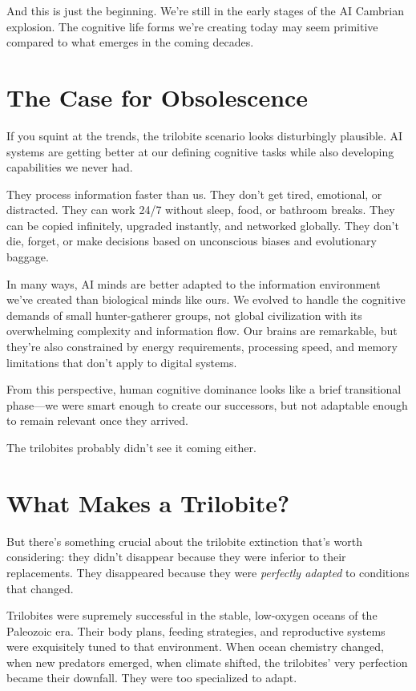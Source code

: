 \documentclass[10pt,twocolumn]{article}
\begin{document}
And this is just the beginning. We're still in the early stages of the AI Cambrian explosion. The cognitive life forms we're creating today may seem primitive compared to what emerges in the coming decades.

\section{The Case for Obsolescence}

If you squint at the trends, the trilobite scenario looks disturbingly plausible. AI systems are getting better at our defining cognitive tasks while also developing capabilities we never had.

They process information faster than us. They don't get tired, emotional, or distracted. They can work 24/7 without sleep, food, or bathroom breaks. They can be copied infinitely, upgraded instantly, and networked globally. They don't die, forget, or make decisions based on unconscious biases and evolutionary baggage.

In many ways, AI minds are better adapted to the information environment we've created than biological minds like ours. We evolved to handle the cognitive demands of small hunter-gatherer groups, not global civilization with its overwhelming complexity and information flow. Our brains are remarkable, but they're also constrained by energy requirements, processing speed, and memory limitations that don't apply to digital systems.

From this perspective, human cognitive dominance looks like a brief transitional phase—we were smart enough to create our successors, but not adaptable enough to remain relevant once they arrived.

The trilobites probably didn't see it coming either.

\section{What Makes a Trilobite?}

But there's something crucial about the trilobite extinction that's worth considering: they didn't disappear because they were inferior to their replacements. They disappeared because they were \textit{perfectly adapted} to conditions that changed.

Trilobites were supremely successful in the stable, low-oxygen oceans of the Paleozoic era. Their body plans, feeding strategies, and reproductive systems were exquisitely tuned to that environment. When ocean chemistry changed, when new predators emerged, when climate shifted, the trilobites' very perfection became their downfall. They were too specialized to adapt.
\end{document}
